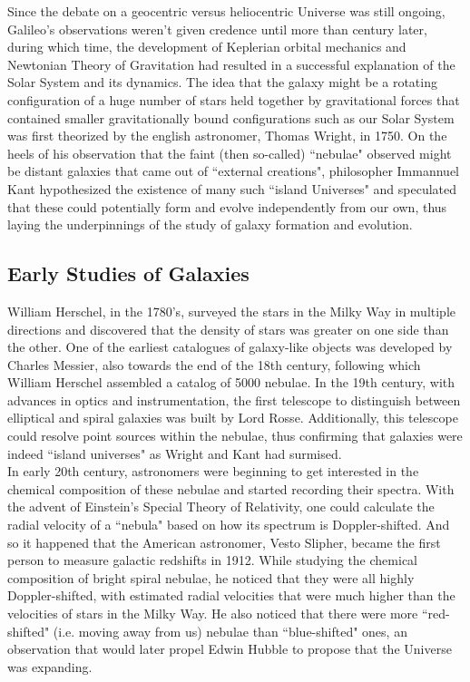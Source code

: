 Since the debate on a geocentric versus heliocentric Universe was still ongoing, Galileo's observations weren't given credence until more than century later, during which time, the development of Keplerian orbital mechanics and Newtonian Theory of Gravitation had resulted in a successful explanation of the Solar System and its dynamics. The idea that the galaxy might be a rotating configuration of a huge number of stars held together by gravitational forces that contained smaller gravitationally bound configurations such as our Solar System was first theorized by the english astronomer, Thomas Wright, in 1750. On the heels of his observation that the faint (then so-called) ``nebulae" observed might be distant galaxies that came out of ``external creations", philosopher Immannuel Kant hypothesized the existence of many such ``island Universes" and speculated that these could potentially form and evolve independently from our own, thus laying the underpinnings of the study of galaxy formation and evolution.\\

\subsection{Early Studies of Galaxies}

William Herschel, in the 1780's, surveyed the stars in the Milky Way in multiple directions and discovered that the density of stars was greater on one side than the other. One of the earliest catalogues of galaxy-like objects was developed by Charles Messier, also towards the end of the 18th century, following which William Herschel assembled a catalog of 5000 nebulae. In the 19th century, with advances in optics and instrumentation, the first telescope to distinguish between elliptical and spiral galaxies was built by Lord Rosse. Additionally, this telescope could resolve point sources within the nebulae, thus confirming that galaxies were indeed ``island universes" as Wright and Kant had surmised.\\

In early 20th century, astronomers were beginning to get interested in the chemical composition of these nebulae and started recording their spectra. With the advent of Einstein's Special Theory of Relativity, one could calculate the radial velocity of a ``nebula" based on how its spectrum is Doppler-shifted. And so it happened that the American astronomer, Vesto Slipher, became the first person to measure galactic redshifts in 1912. While studying the chemical composition of bright spiral nebulae, he noticed that they were all highly Doppler-shifted, with estimated radial velocities that were much higher than the velocities of stars in the Milky Way. He also noticed that there were more ``red-shifted" (i.e. moving away from us) nebulae than ``blue-shifted" ones, an observation that would later propel Edwin Hubble to propose that the Universe was expanding.\\

